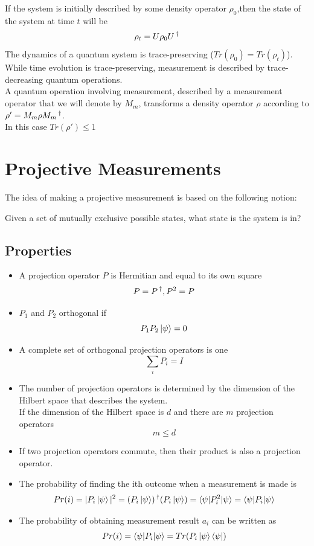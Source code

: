 \documentclass[12pt,oneside]{book}
\begin{document}
If the system is initially described by some density operator $\rho_0$,then the state of the system at time $t$ will be 
\[ \rho_t = U\rho_0U\operatorname{^\dagger} \]
The dynamics of a quantum system is trace-preserving ($Tr(\rho_0) = Tr(\rho_t)$).\\
While time evolution is trace-preserving, measurement is described by trace-decreasing quantum operations.\\
A quantum operation involving measurement, described by a measurement operator that we will denote by $M_m$, transforms a density operator $\rho$ according to $\rho' = M_m\rho M_m\operatorname{^\dagger}$.\\
In this case $Tr(\rho') \leq 1$

\section{Projective Measurements}
The idea of making a projective measurement is based on the following notion:
\begin{center}
    Given a set of mutually exclusive possible states, what state is the system is in?
\end{center}
\subsection{Properties}
    \begin{itemize}
        \item A projection operator $P$ is Hermitian and equal to its own square 
            \[P = P \operatorname{^\dagger} , P^2 = P\]
        \item $P_1$ and $P_2$ orthogonal if 
            \[ P_1P_2\ket{\psi} = 0 \]
        \item  A complete set of orthogonal projection operators is one 
            \[ \sum_i P_i = I \]
        \item The number of projection operators is determined by the dimension of the Hilbert space that describes the system.\\
        If the dimension of the Hilbert space is $d$ and there are $m$ projection operators
        \[ m\leq d \]
        \item If two projection operators commute, then their product is also a projection operator.
        \item The probability of finding the ith outcome when a measurement is made is
            \[ Pr(i) = |P_i\ket{\psi}|^2 = (P_i\ket{\psi})\operatorname{^\dagger}(P_i\ket{\psi}) = \braket{\psi|P_i^2|\psi} = \braket{\psi|P_i|\psi} \]
        \item The probability of obtaining measurement result $a_i$ can be written as 
            \[ Pr(i) = \braket{\psi|P_i|\psi} = Tr(P_i\ket{\psi}\bra{\psi}) \]
    \end{itemize}
\end{document}
